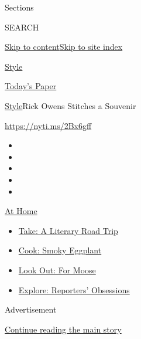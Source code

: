 Sections

SEARCH

\protect\hyperlink{site-content}{Skip to
content}\protect\hyperlink{site-index}{Skip to site index}

\href{https://www.nytimes.com/section/style}{Style}

\href{https://myaccount.nytimes.com/auth/login?response_type=cookie\&client_id=vi}{}

\href{https://www.nytimes.com/section/todayspaper}{Today's Paper}

\href{/section/style}{Style}\textbar{}Rick Owens Stitches a Souvenir

\url{https://nyti.ms/2Bx6gff}

\begin{itemize}
\item
\item
\item
\item
\item
\end{itemize}

\href{https://www.nytimes.com/spotlight/at-home?action=click\&pgtype=Article\&state=default\&region=TOP_BANNER\&context=at_home_menu}{At
Home}

\begin{itemize}
\tightlist
\item
  \href{https://www.nytimes.com/2020/07/28/books/time-for-a-literary-road-trip.html?action=click\&pgtype=Article\&state=default\&region=TOP_BANNER\&context=at_home_menu}{Take:
  A Literary Road Trip}
\item
  \href{https://www.nytimes.com/2020/07/29/magazine/bored-with-your-home-cooking-some-smoky-eggplant-will-fix-that.html?action=click\&pgtype=Article\&state=default\&region=TOP_BANNER\&context=at_home_menu}{Cook:
  Smoky Eggplant}
\item
  \href{https://www.nytimes.com/2020/07/27/travel/moose-michigan-isle-royale.html?action=click\&pgtype=Article\&state=default\&region=TOP_BANNER\&context=at_home_menu}{Look
  Out: For Moose}
\item
  \href{https://www.nytimes.com/interactive/2020/at-home/even-more-reporters-editors-diaries-lists-recommendations.html?action=click\&pgtype=Article\&state=default\&region=TOP_BANNER\&context=at_home_menu}{Explore:
  Reporters' Obsessions}
\end{itemize}

Advertisement

\protect\hyperlink{after-top}{Continue reading the main story}

